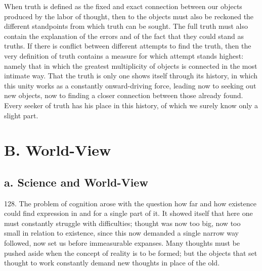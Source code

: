 \documentclass[12pt,a4paper]{book}
\newcommand{\opage}[1]{\marginnote{\footnotesize\textit{[#1]}}}
\begin{document}
When truth is defined as the fixed and exact connection between our objects produced by the
labor of thought, then to the objects must also be reckoned the different standpoints from
which truth can be sought. The full truth must also contain the explanation of the errors and
of the fact that they could stand as truths. If there is conflict between different attempts to
find the truth, then the very definition of truth contains a measure for which attempt stands
highest: namely that in which the greatest multiplicity of objects is connected in the most
intimate way. That the truth is only one shows itself through its history, in which this unity works as a constantly onward-driving force, leading now to seeking out new objects, now to finding a
closer connection between those already found. Every seeker of truth has his place in this
history, of which we surely know only a slight part.


\section*{B. World-View}
\label{sec:verdensanskuelse}

\subsection*{a. Science and World-View}

\opage{306}128. The problem of cognition arose with the question how far and how existence could
find expression in and for a single part of it. It showed itself that here one must
constantly struggle with difficulties; thought was now too big, now too small in
relation to existence, since this now demanded a single narrow way followed, now set us
before immeasurable expanses. Many thoughts must be pushed aside when the concept of
reality is to be formed; but the objects that set thought to work constantly demand new
thoughts in place of the old.
\end{document}
